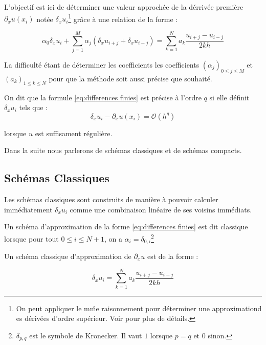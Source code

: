 L'objectif est ici de déterminer une valeur approchée de la dérrivée
première $\partial_xu(x_i)$ notée $\delta_x u_i$\footnote{On peut
  appliquer le m\^me raisonnement pour déterminer une approximationd es
dérivées d'ordre supérieur. Voir \cite{Lele1991} pour plus de détails.} gr\^ace à une relation de la forme :

\begin{equation}
\label{eq:differences finies}
\alpha_0 \delta_x u_i + \sum_{j=1}^M \alpha_j \left( \delta_x u_{i+j} + \delta_x
u_{i-j} \right) = \sum_{k=1}^N a_k \dfrac{u_{i+j} - u_{i-j}}{2kh}
\end{equation}

La difficulté étant de déterminer les coefficients les coefficients
$(\alpha_j)_{0 \leq j \leq M}$ et $(a_k)_{1 \leq k \leq N}$ pour que la
méthode soit aussi précise que souhaité.

\begin{definition}
On dit que la formule \eqref{eq:differences finies} est précise à
l'ordre $q$ si elle définit $\delta_x u_i$ tels que :
\begin{equation}
 \delta_x u_i - \partial_x u(x_i) = \mathcal{O} \left( h^q \right)
\end{equation}

lorsque $u$ est suffisament régulière.
\end{definition}

Dans la suite nous parlerons de schémas classiques et de schémas
compacts.

\subsection{Schémas Classiques }

Les schémas classiques sont construits de manière à pouvoir calculer
immédiatement $\delta_x u_i$ comme une combinaison linéaire de ses
voisins immédiats.

\begin{definition}
Un schéma d'approximation de la forme \eqref{eq:differences finies}
est dit classique lorsque pour tout $0 \leq i \leq N+1$, on a
$\alpha_i = \delta_{0,i}$\footnote{$\delta_{p,q}$ est le symbole de
  Kronecker. Il vaut $1$ lorsque $p=q$ et $0$ sinon.}
\end{definition}

Un schéma classique d'approximation de $\partial_x u$ est de la forme
:

\begin{equation}
 \delta_x u_i = \sum_{k=1}^N a_k \dfrac{u_{i+j} - u_{i-j}}{2kh}
\end{equation}

